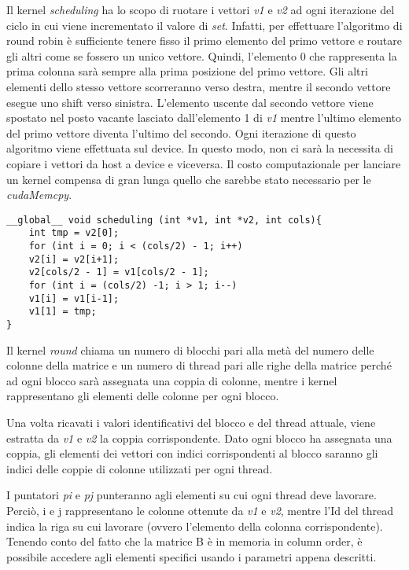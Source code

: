 Il kernel \textit{scheduling} ha lo scopo di ruotare i vettori \textit{v1} e  \textit{v2} ad ogni iterazione del ciclo in cui viene incrementato il valore di \textit{set}. Infatti, per effettuare l'algoritmo di round robin è sufficiente tenere fisso il primo elemento del primo vettore e routare gli altri come se fossero un unico vettore. Quindi, l'elemento 0 che rappresenta la prima colonna sarà sempre alla prima posizione del primo vettore. Gli altri elementi dello stesso vettore scorreranno verso destra, mentre il secondo vettore esegue uno shift verso sinistra. L'elemento uscente dal secondo vettore viene spostato nel posto vacante lasciato dall'elemento 1 di \textit{v1} mentre l'ultimo elemento del primo vettore diventa l'ultimo del secondo.
Ogni iterazione di questo algoritmo viene effettuata sul device. In questo modo, non ci sarà la necessita di copiare i vettori da host a device e viceversa. Il costo computazionale per lanciare un kernel compensa di gran lunga quello che sarebbe stato necessario per le \textit{cudaMemcpy}.
\begin{lstlisting}
__global__ void scheduling (int *v1, int *v2, int cols){
	int tmp = v2[0];
	for (int i = 0; i < (cols/2) - 1; i++)
	v2[i] = v2[i+1];	
	v2[cols/2 - 1] = v1[cols/2 - 1];
	for (int i = (cols/2) -1; i > 1; i--)
	v1[i] = v1[i-1];	
	v1[1] = tmp;
}
\end{lstlisting}

Il kernel \textit{round} chiama un numero di blocchi pari alla metà del numero delle colonne della matrice e un numero di thread pari alle righe della matrice perché ad ogni blocco sarà assegnata una coppia di colonne, mentre i kernel rappresentano gli elementi delle colonne per ogni blocco.

Una volta ricavati i valori identificativi del blocco e del thread attuale, viene estratta da \textit{v1} e  \textit{v2} la coppia corrispondente. Dato ogni blocco ha assegnata una coppia, gli elementi dei vettori con indici corrispondenti al blocco saranno gli indici delle coppie di colonne utilizzati per ogni thread.

I puntatori \textit{pi} e \textit{pj} punteranno agli elementi su cui ogni thread deve lavorare. Perciò, i e j rappresentano le colonne ottenute da \textit{v1} e  \textit{v2}, mentre l'Id del thread indica la riga su cui lavorare (ovvero l'elemento della colonna corrispondente). Tenendo conto del fatto che la matrice B è in memoria in column order, è possibile accedere agli elementi specifici usando i parametri appena descritti.

